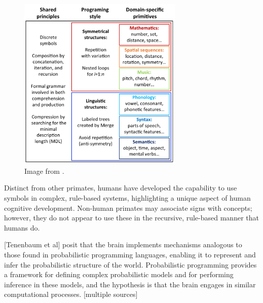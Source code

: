 \begin{figure}[H]
    \centering
    \includegraphics[width=0.7\textwidth]{../img/DSL.png}
    \caption{Image from \cite{dehaene_symbols_2022}.}
    \label{fig:DSL}
\end{figure}

Distinct from other primates, humans have developed the capability to use symbols in complex, rule-based systems, highlighting a unique aspect of human cognitive development. Non-human primates may associate signs with concepts; however, they do not appear to use these in the recursive, rule-based manner that humans do.

[Tenenbaum et al] posit that the brain implements mechanisms analogous to those found in probabilistic programming languages, enabling it to represent and infer the probabilistic structure of the world. Probabilistic programming provides a framework for defining complex probabilistic models and for performing inference in these models, and the hypothesis is that the brain engages in similar computational processes. [multiple sources]

